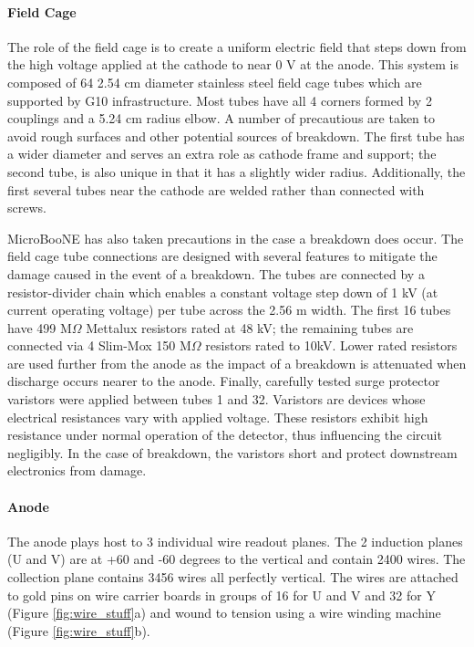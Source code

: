 \documentclass[12pt]{article}
\begin{document}
\paragraph{Field Cage}
\par The role of the field cage is to create a uniform electric field that steps down from the high voltage applied at the cathode to near 0 V at the anode.  This system is composed of 64 2.54 cm diameter stainless steel field cage tubes which are supported by G10 infrastructure. Most tubes have all 4 corners formed by 2 couplings and a 5.24 cm radius elbow. A number of precautious are taken to avoid rough surfaces and other potential sources of breakdown. The first tube has a wider diameter and serves an extra role as cathode frame and support; the second tube, is also unique in that it has a slightly wider radius. Additionally, the first several tubes near the cathode are welded rather than connected with screws.
\par MicroBooNE has also taken precautions in the case a breakdown does occur. The field cage tube connections are designed with several features to mitigate the damage caused in the event of a breakdown. The tubes are connected by a resistor-divider chain which enables a constant voltage step down of 1 kV (at current operating voltage) per tube across the 2.56 m width. The first 16 tubes have 499 M$\Omega$ Mettalux resistors rated at 48 kV; the remaining tubes are connected via 4 Slim-Mox 150 M$\Omega$ resistors rated to 10kV. Lower rated resistors are used further from the anode as the impact of a breakdown is attenuated when discharge occurs nearer to the anode. Finally, carefully tested surge protector varistors \cite{bib:surge} were applied between tubes 1 and 32.  Varistors are devices whose electrical resistances vary with applied voltage. These resistors exhibit high resistance under normal operation of the detector, thus influencing the circuit negligibly. In the case of breakdown, the varistors short and protect downstream electronics from damage.

\paragraph{Anode}
\par The anode plays host to 3 individual wire readout planes. The 2 induction planes (U and V) are at +60 and -60 degrees to the vertical and contain 2400 wires. The collection plane contains 3456 wires all perfectly vertical. The wires are attached to gold pins on wire carrier boards in groups of 16 for U and V and 32 for Y (Figure \ref{fig:wire_stuff}a) and wound to tension using a wire winding machine (Figure \ref{fig:wire_stuff}b). 
\end{document}
